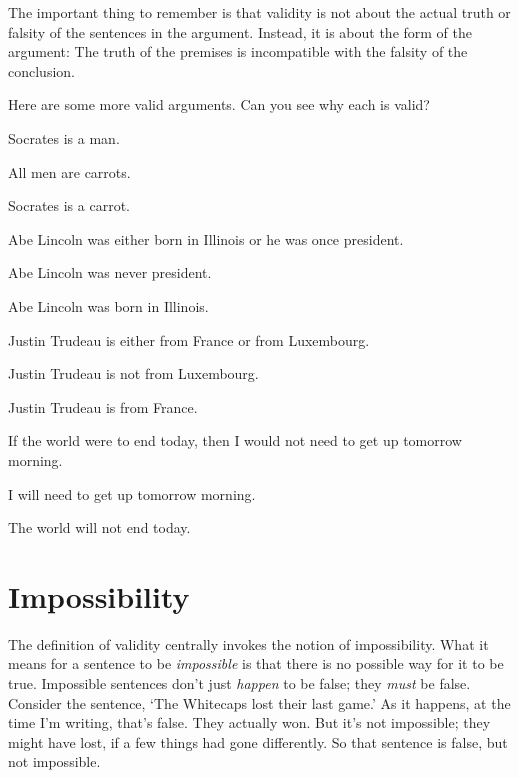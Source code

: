 The important thing to remember is that validity is not about the actual truth or falsity of the sentences in the argument. Instead, it is about the form of the argument: The truth of the premises is incompatible with the falsity of the conclusion.

Here are some more valid arguments. Can you see why each is valid?

\begin{earg}
\item Socrates is a man.
\item All men are carrots.
\item[\therefore] Socrates is a carrot.
\end{earg}


\begin{earg}
\item Abe Lincoln was either born in Illinois or he was once president.
\item Abe Lincoln was never president.
\item[\therefore] Abe Lincoln was born in Illinois.
\end{earg}

\begin{earg}
\item Justin Trudeau is either from France or from Luxembourg.
\item Justin Trudeau is not from Luxembourg.
\item[\therefore] Justin Trudeau is from France.
\end{earg}


\begin{earg}
\item If the world were to end today, then I would not need to get up tomorrow morning.
\item I will need to get up tomorrow morning.
\item[\therefore] The world will not end today.
\end{earg}


\section{Impossibility}
\label{sec.impossible}

The definition of validity centrally invokes the notion of impossibility. What it means for a sentence to be \emph{impossible} is that there is no possible way for it to be true. Impossible sentences don't just \emph{happen} to be false; they \emph{must} be false. Consider the sentence, `The Whitecaps lost their last game.' As it happens, at the time I'm writing, that's false. They actually won. But it's not impossible; they might have lost, if a few things had gone differently. So that sentence is false, but not impossible.

